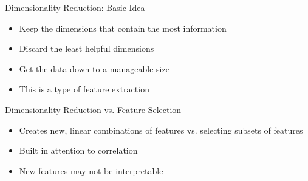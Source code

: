 \documentclass[aspectratio=169]{beamer}
\begin{document}
\begin{frame}{Dimensionality Reduction: Basic Idea}
\begin{itemize}
	\item Keep the dimensions that contain the most information
	\item Discard the least helpful dimensions
	\item Get the data down to a manageable size
	\item This is a type of feature extraction
\end{itemize}
	
\end{frame}
\begin{frame}{Dimensionality Reduction vs. Feature Selection}
\begin{itemize}
	\item Creates new, linear combinations of features vs. selecting subsets of features
	\item Built in attention to correlation
	\item New features may not be interpretable
\end{itemize}
	
\end{frame}
\end{document}
